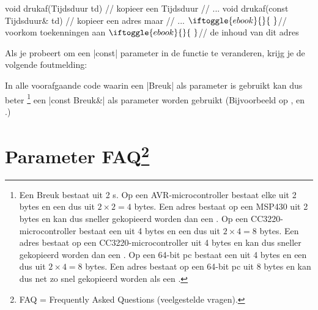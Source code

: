 \begin{cpplstShortInline}
\begin{cpplstfragment}[mathescape=true]
void drukaf(Tijdsduur td) {        // kopieer een Tijdsduur
    // ...
}
void drukaf(const Tijdsduur& td) { // kopieer een adres maar
    // ...                        $\iftoggle{ebook}{}{\ }$// voorkom toekenningen aan  
}                                 $\iftoggle{ebook}{}{\ }$// de inhoud van dit adres
\end{cpplstfragment}

Als je probeert om een |const|  parameter in de functie te veranderen, krijg je de volgende foutmelding:
\begin{cpplstfragment}[mathescape=true]
void drukaf(const Tijdsduur& td) {
    td.uur = 23; // drukaf probeert vals te spelen
//  $\color{hrred}\textbf{error:}$ assignment of member 'Tijdsduur::uur' in read-only object
\end{cpplstfragment}

In alle voorafgaande code waarin een |Breuk| als parameter is gebruikt kan dus beter%
\footnote{%
    Een {Breuk} bestaat uit 2 s. 
    Op een AVR-microcontroller bestaat elke  uit 2 bytes en een  dus uit $2 \times 2 = 4$ bytes. 
    Een adres bestaat op een MSP430 uit 2 bytes en kan dus sneller gekopieerd worden dan een . 
    Op een CC3220-microcontroller bestaat een  uit 4 bytes en een  dus uit $2 \times 4 = 8$ bytes. 
    Een adres bestaat op een CC3220-microcontroller uit 4 bytes en kan dus sneller gekopieerd worden dan een .
    Op een 64-bit pc bestaat een  uit 4 bytes en een  dus uit $2 \times 4 = 8$ bytes. 
    Een adres bestaat op een 64-bit pc uit 8 bytes en kan dus net zo snel gekopieerd worden als een .
} een |const Breuk&| als parameter worden gebruikt (Bijvoorbeeld op ,  \pageref{better used const reference 2} en \pageref{better used const reference 3}.)

\section[Parameter FAQ]{Parameter FAQ\protect\footnote{FAQ = Frequently Asked Questions (veelgestelde vragen).}}



\end{cpplstShortInline}
